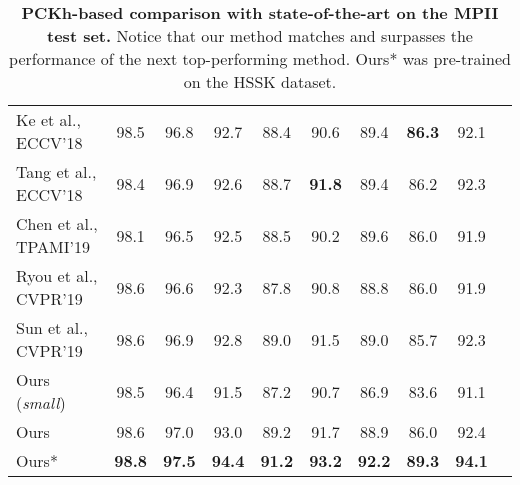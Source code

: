 \documentclass[a4paper, 10pt, conference]{ieeeconf}      \usepackage{FG2020}
\begin{document}
\begin{table*}[ht]
\begin{center}
{\begin{tabular}{lccccccccc}
    Ke et al., ECCV'18~\cite{ke2018multi}& 98.5  & 96.8  & 92.7  & 88.4  & 90.6  & 89.4 & \textbf{86.3} & 92.1\\
    Tang et al., ECCV'18~\cite{tang2018deeply}& 98.4  & 96.9  & 92.6  & 88.7  & \textbf{91.8}  & 89.4 & 86.2 & 92.3 \\
    Chen et al., TPAMI'19~\cite{chen2019adversarial} & 98.1  & 96.5  & 92.5  & 88.5  & 90.2  & 89.6 & 86.0 & 91.9 \\
    Ryou et al., CVPR'19~\cite{ryou2019anchor} & 98.6  & 96.6  & 92.3  & 87.8  & 90.8  & 88.8 & 86.0 & 91.9 \\
    Sun et al., CVPR'19~\cite{sun2019deep} & 98.6  & 96.9  & 92.8  & 89.0  & 91.5  & 89.0 & 85.7 & 92.3 \\
    \midrule 
    Ours (\emph{small})& 98.5  & 96.4  & 91.5  & 87.2  & 90.7  & 86.9 & 83.6 & 91.1 \\
    Ours & 98.6  & 97.0  & 93.0  & 89.2  & 91.7  & 88.9 & 86.0 & 92.4\\
    Ours* & \textbf{98.8}  & \textbf{97.5}  & \textbf{94.4}  & \textbf{91.2}  & \textbf{93.2}  & \textbf{92.2} & \textbf{89.3} & \textbf{94.1}\\
    \bottomrule
    \end{tabular}
    }
    \end{center}
    \caption{\textbf{PCKh-based comparison with state-of-the-art on the MPII test set.}  Notice that our method matches and surpasses the performance of the next top-performing method. Ours* was pre-trained on the HSSK dataset.}
    \label{tab:mpii_results}
\end{table*}
\end{document}
